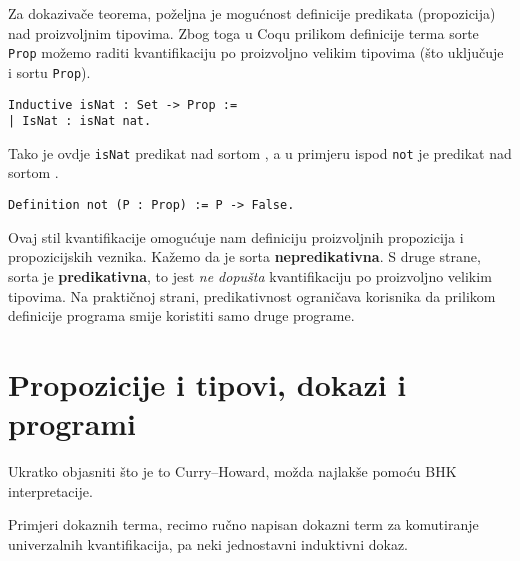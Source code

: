 Za dokazivače teorema, poželjna je mogućnost definicije predikata (propozicija) nad proizvoljnim tipovima.
Zbog toga u Coqu prilikom definicije terma sorte \texttt{Prop} možemo raditi kvantifikaciju po proizvoljno velikim tipovima
(što uključuje i sortu \texttt{Prop}).
\begin{verbatim}
Inductive isNat : Set -> Prop :=
| IsNat : isNat nat.
\end{verbatim}
\noindent Tako je ovdje \texttt{isNat} predikat nad sortom \coqset{}, a u primjeru ispod \texttt{not} je predikat nad sortom \coqprop{}.
\begin{verbatim}
Definition not (P : Prop) := P -> False.
\end{verbatim}
\noindent Ovaj stil kvantifikacije omogućuje nam definiciju proizvoljnih propozicija i propozicijskih veznika.
Kažemo da je sorta \coqprop{} \textbf{nepredikativna}.
S druge strane, sorta \coqset{} je \textbf{predikativna}, to jest \textit{ne dopušta} kvantifikaciju po proizvoljno velikim tipovima.
Na praktičnoj strani, predikativnost ograničava korisnika da prilikom definicije programa smije koristiti samo druge programe.


\section{Propozicije i tipovi, dokazi i programi}\label{sec:propozicije-i-tipovi}
Ukratko objasniti što je to Curry--Howard, možda najlakše pomoću BHK interpretacije.

Primjeri dokaznih terma, recimo ručno napisan dokazni term za komutiranje univerzalnih kvantifikacija, pa neki jednostavni induktivni dokaz.

